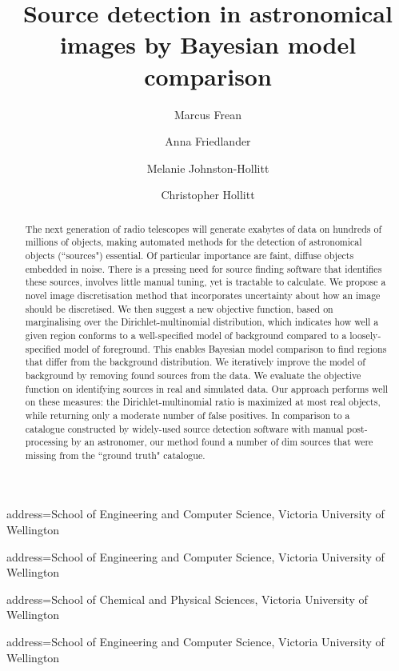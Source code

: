 \documentclass[
    ,final            %
  ]
  {aipproc}
\begin{document}
\title{Source detection in astronomical images by Bayesian model comparison}


\author{Marcus Frean}{
  address={School of Engineering and Computer Science, Victoria University of Wellington}
}

\author{Anna Friedlander}{
  address={School of Engineering and Computer Science, Victoria University of Wellington}
}

\author{Melanie Johnston-Hollitt}{
  address={School of Chemical and Physical Sciences, Victoria University of Wellington}
}

\author{Christopher Hollitt}{
  address={School of Engineering and Computer Science, Victoria University of Wellington}
}

\begin{abstract}
The next generation of radio telescopes will generate exabytes of data on hundreds of millions of objects, making automated methods for the detection of astronomical objects (``sources") essential. Of particular importance are faint, diffuse objects embedded in noise. There is a pressing need for source finding software that identifies these sources, involves little manual tuning, yet is tractable to calculate.  We propose a novel image discretisation method that incorporates uncertainty about how an image should be discretised. We then suggest a new objective function, based on marginalising over the Dirichlet-multinomial distribution, which indicates how well a given region conforms to a well-specified model of background compared to a loosely-specified model of foreground. This enables Bayesian model comparison to find regions that differ from the background distribution. We iteratively improve the model of background by removing found sources from the data. We evaluate the objective function on identifying sources in real and simulated data. Our approach performs well on these measures: the Dirichlet-multinomial ratio is maximized at most real objects, while returning only a moderate number of false positives. In comparison to a catalogue constructed by widely-used source detection software with manual post-processing by an astronomer, our method found a number of dim sources that were missing from the ``ground truth" catalogue. %
\end{abstract}
\end{document}
